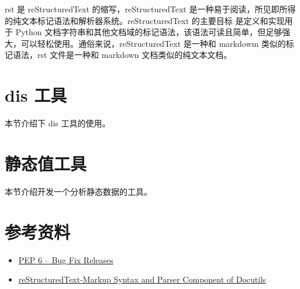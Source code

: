 \begin{definition}[rst 文件] \label{def:int}
rst 是 reStructuredText 的缩写，reStructuredText 是一种易于阅读，所见即所得的纯文本标记语法和解析器系统。reStructuredText 的主要目标
是定义和实现用于 Python 文档字符串和其他文档域的标记语法，该语法可读且简单，但足够强大，可以轻松使用。通俗来说，reStructuredText
 是一种和 markdowm 类似的标记语法，rst 文件是一种和 markdown 文档类似的纯文本文档。
\end{definition}

\section{dis 工具}

本节介绍下 dis 工具的使用。

\section{静态值工具}

本节介绍开发一个分析静态数据的工具。

\section{参考资料}

\begin{itemize}
\item \href{https://peps.python.org/pep-0006/}{PEP 6 – Bug Fix Releases}
\item \href{https://docutils.sourceforge.io/rst.html}{reStructuredText-Markup Syntax and Parser Component of Docutils}
\end{itemize}

